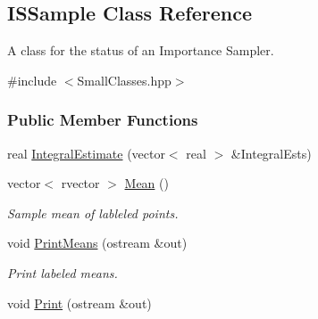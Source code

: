 \hypertarget{classISSample}{\subsection{\-I\-S\-Sample \-Class \-Reference}
\label{classISSample}
}


\-A class for the status of an \-Importance \-Sampler.  




{\ttfamily \#include $<$\-Small\-Classes.\-hpp$>$}

\subsubsection*{\-Public \-Member \-Functions}
\begin{DoxyCompactItemize}
\item 
real \hyperlink{classISSample_ab2913a50ee258c5b55d91202ac35ff00}{\-Integral\-Estimate} (vector$<$ real $>$ \&\-Integral\-Ests)
\item 
vector$<$ rvector $>$ \hyperlink{classISSample_a67d18d57af02d5adc0025eeb025db972}{\-Mean} ()
\begin{DoxyCompactList}\small\item\em \-Sample mean of lableled points. \end{DoxyCompactList}\item 
void \hyperlink{classISSample_a38b62082187bfa35faa6564b0ce874f7}{\-Print\-Means} (ostream \&out)
\begin{DoxyCompactList}\small\item\em \-Print labeled means. \end{DoxyCompactList}\item 
void \hyperlink{classISSample_ae167a6228819ab69bfd4868b455733fd}{\-Print} (ostream \&out)
\end{DoxyCompactItemize}
